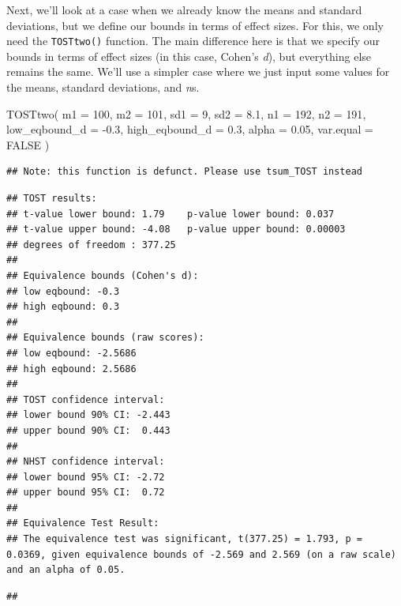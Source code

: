 \documentclass[
]{book}
\newenvironment{Shaded}{\begin{snugshade}}{\end{snugshade}}
\newcommand{\AttributeTok}[1]{\textcolor[rgb]{0.77,0.63,0.00}{#1}}
\newcommand{\ConstantTok}[1]{\textcolor[rgb]{0.00,0.00,0.00}{#1}}
\newcommand{\DecValTok}[1]{\textcolor[rgb]{0.00,0.00,0.81}{#1}}
\newcommand{\FloatTok}[1]{\textcolor[rgb]{0.00,0.00,0.81}{#1}}
\newcommand{\FunctionTok}[1]{\textcolor[rgb]{0.00,0.00,0.00}{#1}}
\newcommand{\NormalTok}[1]{#1}
\newcommand{\SpecialCharTok}[1]{\textcolor[rgb]{0.00,0.00,0.00}{#1}}
\begin{document}
Next, we'll look at a case when we already know the means and standard deviations, but we define our bounds in terms of effect sizes. For this, we only need the \texttt{TOSTtwo()} function. The main difference here is that we specify our bounds in terms of effect sizes (in this case, Cohen's \emph{d}), but everything else remains the same. We'll use a simpler case where we just input some values for the means, standard deviations, and \emph{n}s.

\begin{Shaded}
\begin{Highlighting}[]
\FunctionTok{TOSTtwo}\NormalTok{(}
  \AttributeTok{m1 =} \DecValTok{100}\NormalTok{,}
  \AttributeTok{m2 =} \DecValTok{101}\NormalTok{,}
  \AttributeTok{sd1 =} \DecValTok{9}\NormalTok{,}
  \AttributeTok{sd2 =} \FloatTok{8.1}\NormalTok{,}
  \AttributeTok{n1 =} \DecValTok{192}\NormalTok{,}
  \AttributeTok{n2 =} \DecValTok{191}\NormalTok{,}
  \AttributeTok{low\_eqbound\_d =} \SpecialCharTok{{-}}\FloatTok{0.3}\NormalTok{, }
  \AttributeTok{high\_eqbound\_d =} \FloatTok{0.3}\NormalTok{, }
  \AttributeTok{alpha =} \FloatTok{0.05}\NormalTok{, }
  \AttributeTok{var.equal =} \ConstantTok{FALSE}
\NormalTok{  )}
\end{Highlighting}
\end{Shaded}

\begin{verbatim}
## Note: this function is defunct. Please use tsum_TOST instead
\end{verbatim}

\begin{verbatim}
## TOST results:
## t-value lower bound: 1.79    p-value lower bound: 0.037
## t-value upper bound: -4.08   p-value upper bound: 0.00003
## degrees of freedom : 377.25
## 
## Equivalence bounds (Cohen's d):
## low eqbound: -0.3 
## high eqbound: 0.3
## 
## Equivalence bounds (raw scores):
## low eqbound: -2.5686 
## high eqbound: 2.5686
## 
## TOST confidence interval:
## lower bound 90% CI: -2.443
## upper bound 90% CI:  0.443
## 
## NHST confidence interval:
## lower bound 95% CI: -2.72
## upper bound 95% CI:  0.72
## 
## Equivalence Test Result:
## The equivalence test was significant, t(377.25) = 1.793, p = 0.0369, given equivalence bounds of -2.569 and 2.569 (on a raw scale) and an alpha of 0.05.
\end{verbatim}

\begin{verbatim}
## 
\end{verbatim}
\end{document}
